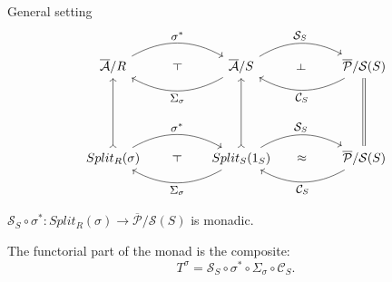 \documentclass[4pt]{beamer}
\begin{document}
\begin{frame}{General setting}
    \[\begin{tikzcd}[every label/.append style = {font = \small}, ampersand replacement=\&]
        \overline{\mathcal{A}}/R \arrow[rr, "\sigma^*", bend left, ""{name=pull}] \& \& \overline{\mathcal{A}}/S \arrow[ll, "\Sigma_\sigma", bend left, ""{name=comp}] \arrow[rr, "\mathcal{S}_S", bend left, ""{name=Ss}] \& \& \overline{\mathcal{P}}/\mathcal{S}(S) \arrow[ll, "\mathcal{C}_S", bend left, ""{name=Cs}] \\ \\ \\ Split_R(\sigma) \arrow[uuu, tail] \arrow[rr, "\sigma^*", bend left, ""{name=pullres}] \& \& Split_S(1_S) \arrow[uuu, tail] \arrow[rr, bend left, "\mathcal{S}_S", ""{name=Ssequi}] \arrow[ll, "\Sigma_\sigma", bend left, ""{name=compres}] \& \& \overline{\mathcal{P}}/\mathcal{S}(S) \arrow[uuu, Rightarrow, no head] \arrow[ll, "\mathcal{C}_S", bend left, ""{name=Csequi}] \arrow[phantom, from=pull, to=comp, "\dashv" rotate=90] \arrow[phantom, from=pullres, to=compres, "\dashv" rotate=90] \arrow[phantom, from=Ss, to=Cs, "\dashv" rotate=270] \arrow[phantom, from=Ssequi, to=Csequi, "\approx"]
    \end{tikzcd}\]

    
    \begin{center}
        $\mathcal{S}_S\circ \sigma^*:Split_R(\sigma)\longrightarrow\overline{\mathcal{P}}/\mathcal{S}(S)$ is monadic.
    \end{center}
    The functorial part of the monad is the composite:
    \[ T^\sigma=\mathcal{S}_S\circ\sigma^*\circ\Sigma_\sigma\circ \mathcal{C}_S. \]
\end{frame}
\end{document}

